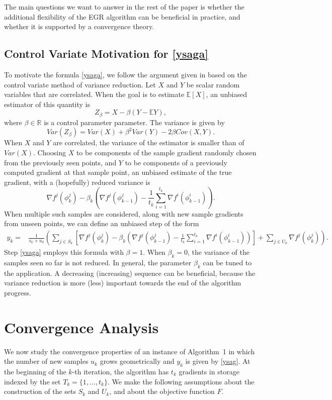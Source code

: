 \documentclass[11pt]{article}
\begin{document}
The main questions we want to answer in the rest of the paper is whether the additional flexibility of the EGR algorithm can be beneficial in practice, and whether it is supported by a convergence theory.

\subsection{Control Variate Motivation for \eqref{ysaga}}
 
 To motivate the formula \eqref{ysaga}, we follow the argument given in  \cite{NIPS2014_5258} based on the control variate method of variance reduction.  Let $X$ and $Y$ be scalar random variables that are correlated. When the goal is to estimate $\mathbb{E} [X]$, an unbiased estimator of this quantity is
\[ Z_\beta = X - \beta ( Y - \mathbb{E}Y), \]
where $\beta \in \mathbb{R}$ is a control parameter parameter.
The variance is given by
\[ Var( Z_\beta) = Var(X) + \beta^2 Var(Y) -2 \beta Cov(X,Y). \]
When $X$ and $Y$ are correlated, the variance of the estimator is smaller than of $Var(X)$.
Choosing $X$ to be components of the sample gradient randomly chosen from the previously seen points, and $Y$ to be components of a previously computed gradient at that sample point, an unbiased estimate of the true gradient, with a (hopefully) reduced variance is
\[  \nabla f^j(\phi^j_{k}) - \beta_k \left( \nabla f^j(\phi_{k-1}^j) - \frac{1}{t_{k}} \sum_{i = 1}^{t_{k} }  \nabla f^i (\phi^i_{k-1}) \right). \]
When multiple such samples are considered, along with new sample gradients from unseen points, we can define an unbiased step of the form 
\begin{align*}
	y_k = & \frac{1}{s_k+u_k} \left(  \sum_{j \in S_k} \left[  \nabla f^j(\phi^j_{k}) - \beta_k \left(  \nabla f^j(\phi_{k-1}^j) - \frac{1}{t_{k}} \sum_{i = 1}^{t_{k} }  \nabla f^i (\phi^i_{k-1}) \right) \right] + \sum_{j \in U_k}  \nabla f^j(\phi^j_{k})\right). 
\end{align*}
Step \eqref{ysaga} employs this formula with $\beta=1$. When $\beta_k=0$, the variance of the samples seen so far is not reduced. In general, the parameter $\beta_k$ can be tuned to the application. A decreasing (increasing) sequence can be beneficial, because the variance reduction is more (less) important towards the end of the algorithm progress.

\section{Convergence Analysis}  \label{analysis}
We now study the convergence properties of an instance of Algorithm~1 in which the number of new samples $u_k$ grows geometrically and $y_k$ is given by \eqref{ysag}. At the beginning of the $k$-th iteration, the algorithm has $t_k$ gradients in storage indexed by the set $T_k= \{1, \ldots, t_k\}$. We make the following assumptions about the construction of the sets $S_k$ and $U_k$, and about the objective function $F$.
\end{document}
